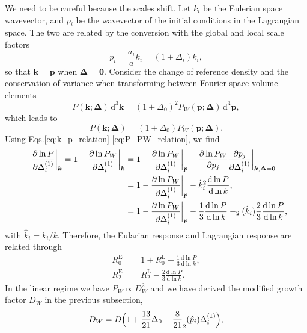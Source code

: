 \documentclass[a4paper,11pt]{article}
\let\L\relax
\DeclareMathOperator{\L}{\mathcal{L}}
\renewcommand{\d}{\mathrm{d}}
\newcommand{\vk}{{\bm k}}
\newcommand{\vp}{{\bm p}}
\newcommand{\vDelta}{{\bm\Delta}}
\newcommand{\Euler}{\mathrm{E}}
\newcommand{\Lagrange}{\mathrm{L}}
\begin{document}
We need to be careful because the scales shift.
Let $k_i$ be the Eulerian space wavevector, and $p_i$ be the wavevector of the
initial conditions in the Lagrangian space.
The two are related by the conversion with the global and local scale factors
\begin{equation}
    p_i = \frac{a_i}a k_i = (1 + \Delta_i) k_i,
    \label{eq:k_p_relation}
\end{equation}
so that $\vk = \vp$ when $\vDelta = \bm0$.
Consider the change of reference density and the conservation of variance when
transforming between Fourier-space volume elements
\begin{equation}
    P (\vk;\vDelta)\,\d^3\vk = (1 + \Delta_0)^2 P_W(\vp;\vDelta) \,\d^3\vp,
\end{equation}
which leads to
\begin{equation}
    P (\vk;\vDelta)= (1 + \Delta_0) P_W(\vp;\vDelta).
    \label{eq:P_PW_relation}
\end{equation}
Using Eqs.\eqref{eq:k_p_relation} \eqref{eq:P_PW_relation}, we find
\begin{align}
    - \frac{\partial\ln P}{\partial\Delta^{(1)}_i} \bigg|_\vk
    = 1 - \frac{\partial\ln P_W}{\partial\Delta^{(1)}_i} \bigg|_\vk
    &= 1 - \frac{\partial\ln P_W}{\partial\Delta^{(1)}_i} \bigg|_\vp
    - \frac{\partial\ln P_W}{\partial p_j}
        \frac{\partial p_j}{\partial \Delta^{(1)}_i} \bigg|_{\vk, \vDelta=\bm0}
    \nonumber\\
    &= 1 - \frac{\partial\ln P_W}{\partial\Delta^{(1)}_i} \bigg|_\vp
    - \hat k_i^2 \frac{\d\ln P}{\d\ln k}, \nonumber\\
    &= 1 - \frac{\partial\ln P_W}{\partial\Delta^{(1)}_i} \bigg|_\vp
    - \frac13 \frac{\d\ln P}{\d\ln k}
    - \L_2(\hat k_i) \frac23 \frac{\d\ln P}{\d\ln k},
\end{align}
with $\hat k_i = k_i / k$.
Therefore, the Eularian response and Lagrangian response are related through
\begin{align}
    R^\Euler_0 &= 1 + R^\Lagrange_0 - \frac13 \frac{\d\ln P}{\d\ln k},
    \nonumber\\
    R^\Euler_2 &= R^\Lagrange_2 - \frac23 \frac{\d\ln P}{\d\ln k}.
\end{align}
In the linear regime we have $P_W \propto D_W^2$ and we have derived the modified growth factor $D_W$ in the previous subsection,
\begin{equation}
    D_W = D \Bigl( 1 + \frac{13}{21} \Delta_0
    - \frac8{21} \L_2(\hat p_i) \Delta^{(1)}_i \Bigr),
    \label{DW}
\end{equation}
\end{document}
